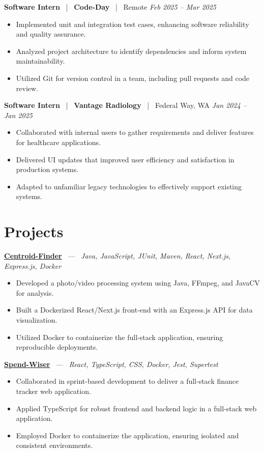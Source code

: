 \documentclass[10pt, letterpaper]{article}
\newcommand{\jobhead}[4]{%
  \vspace{5pt}%
  {\bfseries\color{dark}#1}%
  ~{\color{light}|}~%
  {\bfseries\color{navy}#2}%
  ~{\color{light}|}~%
  {\color{light}#3}%
  \hfill{\color{light}\small\textit{#4}}\\[-2pt]%
}
\newcommand{\projhead}[3]{%
  \vspace{5pt}%
  {\bfseries\color{dark}\href{#2}{#1}}%
  ~{\color{light}---}~%
  {\color{light}\small\textit{#3}}\\[-2pt]%
}
\begin{document}
\jobhead{Software Intern}{Code-Day}{Remote}{Feb 2025 – Mar 2025}
\begin{itemize}
  \item Implemented unit and integration test cases, enhancing software reliability and quality assurance.
  \item Analyzed project architecture to identify dependencies and inform system maintainability.
  \item Utilized Git for version control in a team, including pull requests and code review.
\end{itemize}

\jobhead{Software Intern}{Vantage Radiology}{Federal Way, WA}{Jan 2024 – Jan 2025}
\begin{itemize}
  \item Collaborated with internal users to gather requirements and deliver features for healthcare applications.
  \item Delivered UI updates that improved user efficiency and satisfaction in production systems.
  \item Adapted to unfamiliar legacy technologies to effectively support existing systems.
\end{itemize}

\section{Projects}

\projhead{Centroid-Finder}{https://github.com/xavierb117/centroid-finder}{Java, JavaScript, JUnit, Maven, React, Next.js, Express.js, Docker}
\begin{itemize}
  \item Developed a photo/video processing system using Java, FFmpeg, and JavaCV for analysis.
  \item Built a Dockerized React/Next.js front-end with an Express.js API for data visualization.
  \item Utilized Docker to containerize the full-stack application, ensuring reproducible deployments.
\end{itemize}

\projhead{Spend-Wiser}{https://github.com/JesseChum/w26-sdev372-spendwiser-finance-tracker}{React, TypeScript, CSS, Docker, Jest, Supertest}
\begin{itemize}
  \item Collaborated in sprint-based development to deliver a full-stack finance tracker web application.
  \item Applied TypeScript for robust frontend and backend logic in a full-stack web application.
  \item Employed Docker to containerize the application, ensuring isolated and consistent environments.
\end{itemize}
\end{document}
